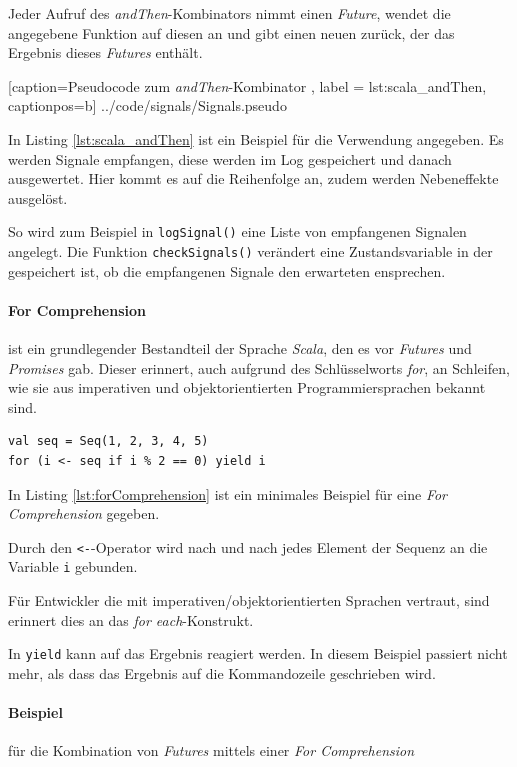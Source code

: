 Jeder Aufruf des \emph{andThen}-Kombinators nimmt einen \emph{Future},
wendet die angegebene Funktion auf diesen an und gibt einen neuen
zurück, der das Ergebnis dieses \emph{Futures} enthält.


    [caption={Pseudocode zum \emph{andThen}-Kombinator },
       label = lst:scala_andThen,
       captionpos=b]
 {../code/signals/Signals.pseudo}
 
In Listing \ref{lst:scala_andThen} ist ein Beispiel
für die Verwendung angegeben. Es werden Signale empfangen, diese
werden im Log gespeichert und danach ausgewertet. Hier kommt es auf
die Reihenfolge an, zudem werden Nebeneffekte ausgelöst.

So wird zum Beispiel in \texttt{logSignal()} eine Liste von empfangenen
Signalen angelegt. Die Funktion \texttt{checkSignals()} verändert
eine Zustandsvariable in der gespeichert ist, ob die empfangenen
Signale den erwarteten ensprechen.

\paragraph{For Comprehension} ist ein grundlegender Bestandteil
der Sprache \emph{Scala}, den es vor \emph{Futures} und \emph{Promises}
gab. Dieser erinnert, auch aufgrund des Schlüsselworts \emph{for},
an Schleifen, wie sie aus imperativen und objektorientierten
Programmiersprachen bekannt sind.

\begin{lstlisting}[caption={For Comprehension},label={lst:forComprehension},captionpos=b]
val seq = Seq(1, 2, 3, 4, 5)
for (i <- seq if i % 2 == 0) yield i
\end{lstlisting}

In Listing \ref{lst:forComprehension} ist ein minimales Beispiel für
eine \emph{For Comprehension} gegeben.

Durch den \texttt{<-}-Operator wird nach und nach jedes Element
der Sequenz an die Variable \texttt{i} gebunden.

Für Entwickler die mit imperativen/objektorientierten Sprachen
vertraut, sind erinnert dies an das \emph{for each}-Konstrukt.

In \texttt{yield} kann auf das Ergebnis reagiert werden. In diesem
Beispiel passiert nicht mehr, als dass das Ergebnis auf die Kommandozeile
geschrieben wird.

\paragraph{Beispiel} für die Kombination von \emph{Futures} mittels
einer \emph{For Comprehension}

